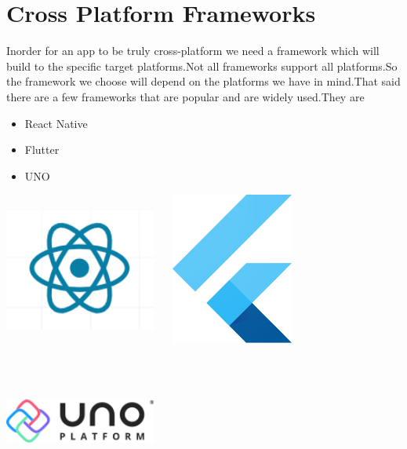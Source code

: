 \documentclass[14pt]{extarticle}
\begin{document}
\newpage
\section{
  Cross Platform Frameworks
 }
\parbox{\linewidth}{
    \setlength{\parskip}{1em}

    Inorder for an app to be truly cross-platform we need a framework which will build to the specific target platforms.Not all frameworks support all platforms.So the framework we choose will depend on the platforms we have in mind.That said there are a few frameworks that are popular and are widely used.They are
}

\begin{itemize}
    \item React Native
    \item Flutter
    \item UNO
\end{itemize}

\vfil

\begin{center}
    \includegraphics[width=50mm,height=50mm,keepaspectratio]{react native logo.png}
    \hfil
    \includegraphics[width=50mm,height=50mm,keepaspectratio]{flutter-icon.png}
    \hfil
    \vfil
    \includegraphics[width=50mm,height=50mm,keepaspectratio]{uno-platform-logo.png}
\end{center}
\end{document}
